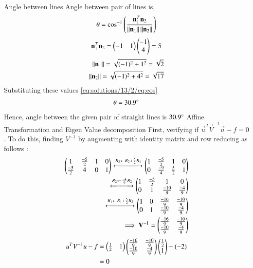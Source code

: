 {Angle between lines}
Angle between pair of lines is,
\begin{align}\label{eq:solutions/13/2/eq:cos}
    \theta = \cos^{-1}\left(\frac{\mathbf{n}_1^T\mathbf{n}_2}{\left\lVert\mathbf{n}_1\right\rVert\left\lVert\mathbf{n}_2\right\rVert}\right)
\end{align}
\begin{align}
    \mathbf{n}_1^T\mathbf{n}_2 = \begin{pmatrix}-1 & 1\end{pmatrix}\begin{pmatrix}-1 \\ 4\end{pmatrix} = 5 \label{eq:solutions/13/2/eq:a2} 
\end{align}
\begin{align}
    \left\lVert\mathbf{n}_1\right\rVert=\sqrt{(-1)^2+1^2}=\sqrt{2}\\
    \left\lVert\mathbf{n}_2\right\rVert=\sqrt{(-1)^2+4^2}=\sqrt{17} \label{eq:solutions/13/2/eq:}
\end{align}
Substituting these values \eqref{eq:solutions/13/2/eq:cos}
\begin{align}
    \theta = 30.9\degree
\end{align}
Hence, angle between the given pair of straight lines is $30.9\degree$
{Affine Transformation and Eigen Value decomposition}
First, verifying if $\vec{u}^T\vec{V}^{-1}\vec{u}-f = 0$. To do this, finding $V^{-1}$ by augmenting with identity matrix and row reducing as follows :
\begin{align}
    \begin{pmatrix}1 & \frac{-5}{2} & 1 & 0\\ \frac{-5}{2} & 4 & 0 & 1\end{pmatrix}\xleftrightarrow{R_2\leftarrow R_2 + \frac{5}{2}R_1}\begin{pmatrix}1 & \frac{-5}{2} & 1 & 0\\ 0 & \frac{-9}{4} & \frac{5}{2} & 1\end{pmatrix}\\\xleftrightarrow{R_2\leftarrow\frac{-4}{9}R_2}\begin{pmatrix}1 & \frac{-5}{2} & 1 & 0\\ 0 & 1 & \frac{-10}{9} & \frac{-4}{9}\end{pmatrix}\\\xleftrightarrow{R_1\leftarrow R_1 + \frac{5}{2}R_2}\begin{pmatrix}1 & 0 & \frac{-16}{9} & \frac{-10}{9}\\ 0 & 1 & \frac{-10}{9} & \frac{-4}{9}\end{pmatrix}\\
    \implies\mathbf{V}^{-1} = \begin{pmatrix}\frac{-16}{9} & \frac{-10}{9} \\ \frac{-10}{9} & \frac{-4}{9}\end{pmatrix}
\end{align}
\begin{align}
    u^TV^{-1}u-f & = \begin{pmatrix}\frac{1}{2} & 1\end{pmatrix}\begin{pmatrix}\frac{-16}{9} & \frac{-10}{9} \\ \frac{-10}{9} & \frac{-4}{9}\end{pmatrix}\begin{pmatrix}\frac{1}{2} \\ 1\end{pmatrix} - (-2) \\ & = 0
\end{align}
